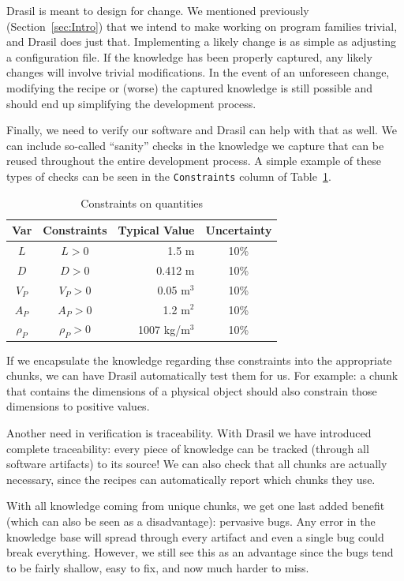 \documentclass[preprint, 10pt]{sigplanconf}
\begin{document}
Drasil is meant to design for change. We mentioned previously
(Section~\ref{sec:Intro}) that we intend to make working on program families
trivial, and Drasil does just that. Implementing a likely change is as simple as
adjusting a configuration file. If the knowledge has been properly captured, any
likely changes will involve trivial modifications. In the event of an unforeseen
change, modifying the recipe or (worse) the captured knowledge is still possible
and should end up simplifying the development process.

Finally, we need to verify our software and Drasil can help with that as well.
We can include so-called ``sanity'' checks in the knowledge we capture that can
be reused throughout the entire development process. A simple example of these
types of checks can be seen in the \verb|Constraints| column of
Table~\ref{tab:constraints}.

\begin{table} 
\centering
\nocaptionrule \caption{Constraints on quantities}
\begin{tabular}{|c|c|r|c|} \hline
\textbf{Var} & \textbf{Constraints} & \textbf{Typical Value} & \textbf{Uncertainty}\\ \hline
$L$ & $L > 0$ & 1.5 m & 10\% \\ \hline
$D$ & $D > 0$ & 0.412 m & 10\% \\ \hline
$V_P$ & $V_P > 0$ & 0.05 m$^3$	& 10\% \\ \hline
$A_P$ & $A_P > 0$ & 1.2 m$^2$	& 10\% \\ \hline
$\rho_P$ & $\rho_P > 0$	& 1007 kg/m$^3$	& 10\% \\
\hline\end{tabular}
\label{tab:constraints}
\end{table}

If we encapsulate the knowledge regarding thse constraints into the appropriate
chunks, we can have Drasil automatically test them for us. For example: a chunk
that contains the dimensions of a physical object should also constrain those
dimensions to positive values.

Another need in verification is traceability. With Drasil we have introduced
complete traceability: every piece of knowledge can be tracked (through all
software artifacts) to its source! We can also check that all chunks are
actually necessary, since the recipes can automatically report which chunks they
use.

With all knowledge coming from unique chunks, we get one last added benefit
(which can also be seen as a disadvantage): pervasive bugs. Any error in the
knowledge base will spread through every artifact and even a single bug could
break everything. However, we still see this as an advantage since the bugs tend
to be fairly shallow, easy to fix, and now much harder to miss.
\end{document}
